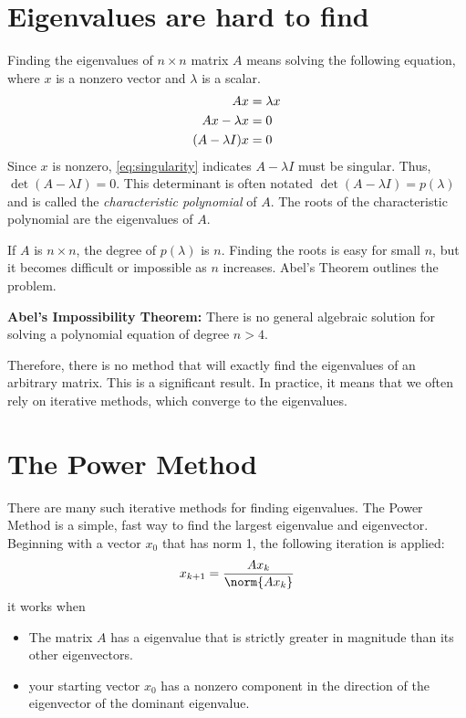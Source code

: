 \label{lab:EigSolve}

\section*{Eigenvalues are hard to find}

Finding the eigenvalues of $n \times n$ matrix $A$ means solving the following equation, where $x$ is a nonzero vector and $\lambda$ is a scalar.
\begin{align}
A x &= \lambda x \notag \\
A x - \lambda x &= 0 \notag \\
(A - \lambda I)x  &= 0 \label{eq:singularity}
\end{align}
Since $x$ is nonzero, \eqref{eq:singularity} indicates $A-\lambda I$ must be singular.
Thus, $\det(A - \lambda I) = 0$.  This determinant is often notated $\det(A - \lambda I) = p(\lambda)$ and is called the \emph{characteristic polynomial} of $A$.
The roots of the characteristic polynomial are the eigenvalues of $A$.

If $A$ is $n \times n$, the degree of $p(\lambda)$ is  $n$.
Finding the roots is easy for small $n$, but it becomes difficult or impossible as $n$ increases.
Abel's Theorem  outlines the problem.

\begin{theorem}
{\bf Abel's Impossibility Theorem:} There is no general algebraic solution for solving a polynomial equation of degree $n>4$.
\label{Theorem:Abel}
\end{theorem}

Therefore, there is no method that will exactly find the eigenvalues of an arbitrary matrix.
This is a significant result. In practice, it means that we often rely on iterative methods, which converge to the eigenvalues.

\section*{The Power Method}
There are many such iterative methods for finding eigenvalues. The Power Method is a simple, fast way to find the largest eigenvalue and eigenvector. Beginning with a vector $x_0$ that has norm 1, the following iteration is applied:
\[
x_{k+1}=\frac{Ax_k}{\norm{Ax_k}}
\]
it works when
\begin{itemize}
\item The matrix $A$ has a eigenvalue that is strictly greater in magnitude than its other eigenvectors.
\item your starting vector $x_0$ has a nonzero component in the direction of the eigenvector of the dominant eigenvalue.

\end{itemize}

